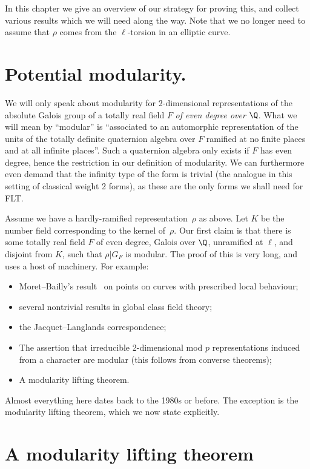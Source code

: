 In this chapter we give an overview of our strategy for proving this, and collect
various results which we will need along the way. Note that we no longer need to assume that $\rho$ comes from the $\ell$-torsion in an elliptic curve.

\section{Potential modularity.}

We will only speak about modularity for 2-dimensional representations of the
absolute Galois group of a totally real field $F$ \emph{of even degree over} $\Q$.
What we will mean by ``modular'' is ``associated to an automorphic representation of the
units of the totally definite quaternion algebra over $F$ ramified at no finite places
and at all infinite places''. Such a quaternion algebra only exists if $F$ has even degree,
hence the restriction in our definition of modularity.
We can furthermore even demand that the infinity type of the form is trivial (the analogue
in this setting of classical weight 2 forms), as these are the only forms we shall need for FLT.

Assume we have a hardly-ramified representation~$\rho$ as above. Let $K$
be the number field corresponding to the kernel of~$\rho$. Our first claim
is that there is some totally real field $F$ of even degree, Galois over $\Q$,
unramified at $\ell$, and disjoint from $K$, such that $\rho|G_F$ is modular.
The proof of this is very long, and uses a host of machinery. For example:
\begin{itemize}
    \item Moret--Bailly's result~\cite{moret-bailly} on points on curves with prescribed
    local behaviour;
    \item several nontrivial results in global class field theory;
    \item the Jacquet--Langlands correspondence;
    \item The assertion that irreducible 2-dimensional mod $p$ representations induced from a character are modular (this follows from converse theorems);
    \item A modularity lifting theorem.
\end{itemize}

Almost everything here dates back to the 1980s or before.
The exception is the modularity lifting theorem, which we now state explicitly.

\section{A modularity lifting theorem}

